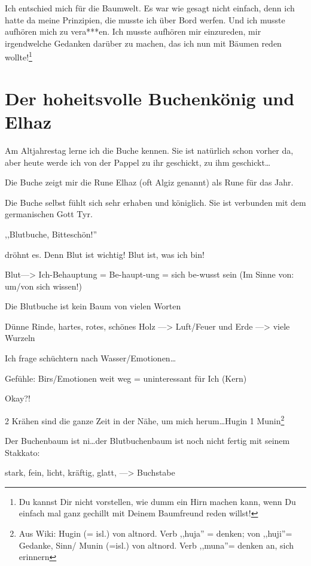 \documentclass[11pt,titlepage,a5paper]{book}
\begin{document}
Ich entschied mich für die Baumwelt. Es war wie gesagt nicht einfach, denn ich hatte da meine Prinzipien, die musste ich über Bord werfen. Und ich musste aufhören mich zu vera***en. Ich musste aufhören mir einzureden, mir irgendwelche Gedanken darüber zu machen, das ich nun mit Bäumen reden wollte!\footnote{Du kannst Dir nicht vorstellen, wie dumm ein Hirn machen kann, wenn Du einfach mal ganz gechillt mit Deinem Baumfreund reden willst!}




\section{Der hoheitsvolle Buchenkönig und Elhaz  }

Am Altjahrestag lerne ich die Buche kennen. Sie ist natürlich schon vorher da, aber heute werde ich von der Pappel zu ihr geschickt, zu ihm geschickt\dots

Die Buche zeigt mir die Rune Elhaz (oft Algiz genannt)  als Rune für das Jahr.

Die Buche selbst fühlt sich sehr erhaben und königlich. Sie ist verbunden mit dem germanischen Gott Tyr.

\begin{Large}
,,Blutbuche, Bitteschön!''
\end{Large} 
dröhnt es. Denn Blut ist wichtig! Blut ist, was ich bin!

Blut---> Ich-Behauptung = Be-haupt-ung = sich be-wusst sein (Im Sinne von: um/von sich wissen!)

Die Blutbuche ist kein Baum von vielen Worten

Dünne Rinde, hartes, rotes, schönes Holz ---> Luft/Feuer und Erde ---> viele Wurzeln

Ich frage schüchtern nach Wasser/Emotionen\dots

Gefühle: Birs/Emotionen weit weg = uninteressant für Ich (Kern)

Okay?!

2 Krähen sind die ganze Zeit in der Nähe, um mich herum\dots Hugin 1 Munin\footnote{Aus Wiki: Hugin (= isl.) von altnord. Verb ,,huja'' = denken; von ,,huji''= Gedanke, Sinn/ Munin (=isl.) von altnord. Verb ,,muna''= denken an, sich erinnern}

Der Buchenbaum ist ni\dots der Blutbuchenbaum ist noch nicht fertig mit seinem Stakkato:

stark, fein, licht, kräftig, glatt, ---> Buchstabe
\end{document}
